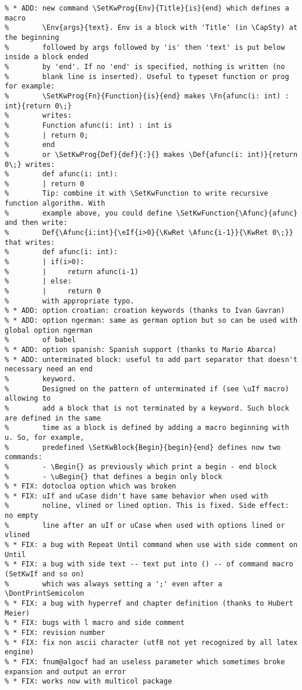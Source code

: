 \documentclass[a4paper]{article}
\begin{document}
\begin{verbatim}
% * ADD: new command \SetKwProg{Env}{Title}{is}{end} which defines a macro
%        \Env{args}{text}. Env is a block with 'Title' (in \CapSty) at the beginning
%        followed by args followed by 'is' then 'text' is put below inside a block ended
%        by 'end'. If no 'end' is specified, nothing is written (no
%        blank line is inserted). Useful to typeset function or prog for example:
%        \SetKwProg{Fn}{Function}{is}{end} makes \Fn{afunc(i: int) : int}{return 0\;}                    
%        writes: 
%        Function afunc(i: int) : int is
%        | return 0;
%        end
%        or \SetKwProg{Def}{def}{:}{} makes \Def{afunc(i: int)}{return 0\;} writes:
%        def afunc(i: int):
%        | return 0
%        Tip: combine it with \SetKwFunction to write recursive function algorithm. With
%        example above, you could define \SetKwFunction{\Afunc}{afunc} and then write:
%        Def{\Afunc{i:int}{\eIf{i>0}{\KwRet \Afunc{i-1}}{\KwRet 0\;}} that writes:
%        def afunc(i: int):
%        | if(i>0):
%        |     return afunc(i-1)
%        | else:
%        |     return 0
%        with appropriate typo.
% * ADD: option croatian: croation keywords (thanks to Ivan Gavran)
% * ADD: option ngerman: same as german option but so can be used with global option ngerman
%        of babel
% * ADD: option spanish: Spanish support (thanks to Mario Abarca)
% * ADD: unterminated block: useful to add part separator that doesn't necessary need an end
%        keyword.  
%        Designed on the pattern of unterminated if (see \uIf macro) allowing to
%        add a block that is not terminated by a keyword. Such block are defined in the same
%        time as a block is defined by adding a macro beginning with u. So, for example,
%        predefined \SetKwBlock{Begin}{begin}{end} defines now two commands:
%        - \Begin{} as previously which print a begin - end block
%        - \uBegin{} that defines a begin only block
% * FIX: dotocloa option which was broken
% * FIX: uIf and uCase didn't have same behavior when used with
%        noline, vlined or lined option. This is fixed. Side effect: no empty
%        line after an uIf or uCase when used with options lined or vlined
% * FIX: a bug with Repeat Until command when use with side comment on Until
% * FIX: a bug with side text -- text put into () -- of command macro (SetKwIf and so on)
%        which was always setting a ';' even after a \DontPrintSemicolon
% * FIX: a bug with hyperref and chapter definition (thanks to Hubert Meier)
% * FIX: bugs with l macro and side comment
% * FIX: revision number
% * FIX: fix non ascii character (utf8 not yet recognized by all latex engine)
% * FIX: fnum@algocf had an useless parameter which sometimes broke expansion and output an error
% * FIX: works now with multicol package
\end{verbatim}

\clearpage
\listofalgorithms
\clearpage
\printindex
\end{document}
